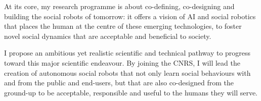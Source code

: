 \begin{framed}

\bf

At its core, my research programme is about co-defining, co-designing and
building the social robots of tomorrow: it offers a vision of AI and social
robotics that places the human at the centre of these emerging technologies,
to foster novel social dynamics that are acceptable and beneficial to
society.

I propose an ambitious yet realistic scientific and technical pathway to
progress toward this major scientific endeavour. By joining the CNRS, I
will lead the creation of autonomous social robots that not only learn
social behaviours with and from the public and end-users, but that are also
co-designed from the ground-up to be acceptable, responsible and useful to
the humans they will serve.


\end{framed}


